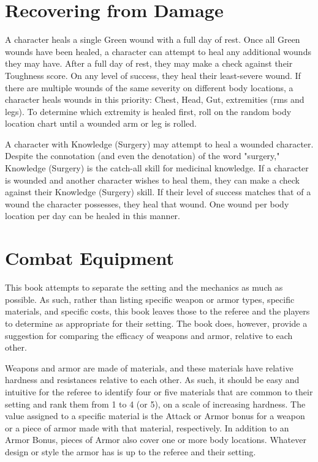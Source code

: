 \documentclass[oneside]{book}
\begin{document}
\begin{multicols}{2}
\section{Recovering from Damage}
A character heals a single Green wound with a full day of rest. Once all Green wounds have been healed, a character can attempt to heal any additional wounds they may have. After a full day of rest, they may make a check against their Toughness score. On any level of success, they heal their least-severe wound. If there are multiple wounds of the same severity on different body locations, a character heals wounds in this priority: Chest, Head, Gut, extremities (rms and legs). To determine which extremity is healed first, roll on the random body location chart until a wounded arm or leg is rolled. 

A character with Knowledge (Surgery) may attempt to heal a wounded character. Despite the connotation (and even the denotation) of the word "surgery," Knowledge (Surgery) is the catch-all skill for medicinal knowledge. If a character is wounded and another character wishes to heal them, they can make a check against their Knowledge (Surgery) skill. If their level of success matches that of a wound the character possesses, they heal that wound. One wound per body location per day can be healed in this manner. 

\section{Combat Equipment}
This book attempts to separate the setting and the mechanics as much as possible. As such, rather than listing specific weapon or armor types, specific materials, and specific costs, this book leaves those to the referee and the players to determine as appropriate for their setting. The book does, however, provide a suggestion for comparing the efficacy of weapons and armor, relative to each other. 

Weapons and armor are made of materials, and these materials have relative hardness and resistances relative to each other. As such, it should be easy and intuitive for the referee to identify four or five materials that are common to their setting and rank them from 1 to 4 (or 5), on a scale of increasing hardness. The value assigned to a specific material is the Attack or Armor bonus for a weapon or a piece of armor made with that material, respectively. In addition to an Armor Bonus, pieces of Armor also cover one or more body locations. Whatever design or style the armor has is up to the referee and their setting. 


\end{multicols}
\end{document}
